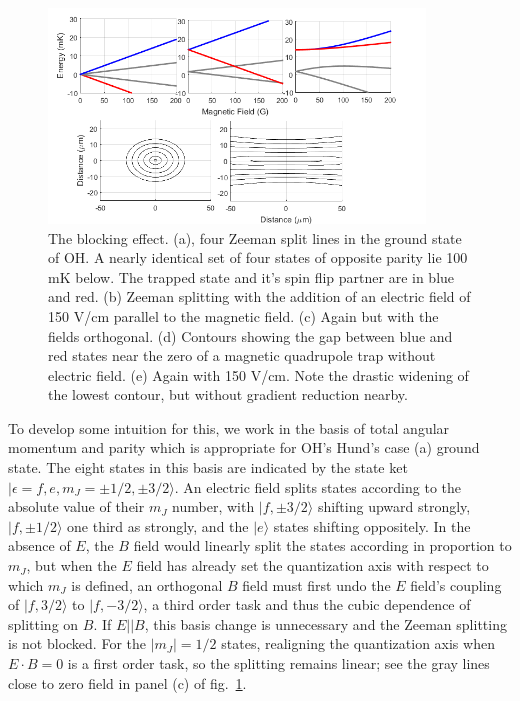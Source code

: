 \documentclass[%
 reprint,
 amsmath,amssymb,
 aps,
prl,
]{revtex4-1}
\begin{document}
\begin{figure}
\includegraphics[width=100mm]{blocking.png}%
\caption{
The blocking effect. (a), four Zeeman split lines in the ground state of OH. A nearly identical set of four states of opposite parity lie 100 mK below. The trapped state and it's spin flip partner are in blue and red. (b) Zeeman splitting with the addition of an electric field of 150 V/cm parallel to the magnetic field. (c) Again but with the fields orthogonal. (d) Contours showing the gap between blue and red states near the zero of a magnetic quadrupole trap without electric field. (e) Again with 150 V/cm. Note the drastic widening of the lowest contour, but without gradient reduction nearby.
\label{fig:blocking}}
\end{figure}

To develop some intuition for this, we work in the basis of total angular momentum and parity which is appropriate for OH's Hund's case (a) ground state. The eight states in this basis are indicated by the state ket $|\epsilon=f,e,m_J=\pm1/2,\pm3/2\rangle$. An electric field splits states according to the absolute value of their $m_J$ number, with $|f,\pm3/2\rangle$ shifting upward strongly, $|f,\pm1/2\rangle$ one third as strongly, and the $|e\rangle$ states shifting oppositely. In the absence of $E$, the $B$ field would linearly split the states according in proportion to $m_J$, but when the $E$ field has already set the quantization axis with respect to which $m_J$ is defined, an orthogonal $B$ field must first undo the $E$ field's coupling of $|f,3/2\rangle$ to $|f,-3/2\rangle$, a third order task and thus the cubic dependence of splitting on $B$. If $E||B$, this basis change is unnecessary and the Zeeman splitting is not blocked. For the $|m_J|=1/2$ states, realigning the quantization axis when $E\cdot B=0$ is a first order task, so the splitting remains linear; see the gray lines close to zero field in panel (c) of fig.~\ref{fig:blocking}. 
\end{document}
